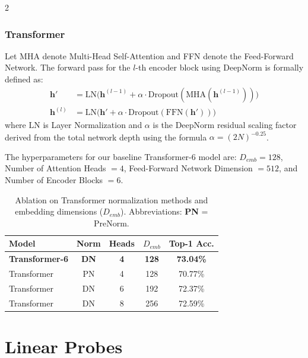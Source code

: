 \documentclass[a4paper,10pt]{article}
\begin{document}
\begin{multicols*}{2}
\subsubsection{Transformer}
\label{transformer_details}
Let MHA denote Multi-Head Self-Attention and FFN denote the Feed-Forward Network. The forward pass for the $l$-th encoder block using DeepNorm is formally defined as:
$$ \begin{aligned}
\mathbf{h}' &= \text{LN}\big(\mathbf{h}^{(l-1)} + \alpha \cdot \text{Dropout}(\text{MHA}(\mathbf{h}^{(l-1)}))\big) \\
\mathbf{h}^{(l)} &= \text{LN}\big(\mathbf{h}' + \alpha \cdot \text{Dropout}(\text{FFN}(\mathbf{h}'))\big)
\end{aligned} $$
where $\text{LN}$ is Layer Normalization and $\alpha$ is the DeepNorm residual scaling factor derived from the total network depth using the formula $\alpha = (2N)^{-0.25}$.

The hyperparameters for our baseline Transformer-6 model are: $D_{emb} = 128$, Number of Attention Heads $= 4$, Feed-Forward Network Dimension $= 512$, and Number of Encoder Blocks $= 6$.

\begin{table}[H]
\centering
\caption{Ablation on Transformer normalization methods and embedding dimensions ($D_{emb}$). Abbreviations: \textbf{PN} = PreNorm.}
\label{tab:transformer_ablations}
\begin{tabular}{@{}lcccc@{}}
\toprule
\textbf{Model} & \textbf{Norm} & \textbf{Heads} & \textbf{$D_{emb}$} & \textbf{Top-1 Acc.} \\ \midrule
\textbf{Transformer-6} & \textbf{DN} & \textbf{4} & \textbf{128} & \textbf{73.04\%} \\ \midrule
Transformer & PN & 4 & 128 & 70.77\% \\
Transformer & DN & 6 & 192 & 72.37\% \\
Transformer & DN & 8 & 256 & 72.59\% \\ \bottomrule
\end{tabular}
\end{table}

\section{Linear Probes}

\end{multicols*}
\end{document}
